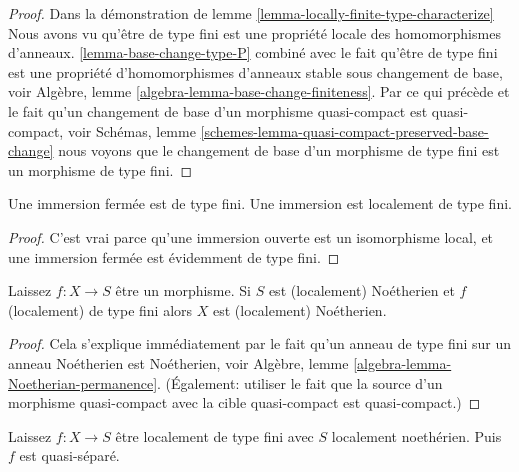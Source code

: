 \begin{proof}

Dans la démonstration de lemme \ref{lemma-locally-finite-type-characterize}
Nous avons vu qu'être de type fini est une propriété locale des homomorphismes d'anneaux. \ref{lemma-base-change-type-P} combiné avec le fait qu'être de type fini est une propriété d'homomorphismes d'anneaux stable sous changement de base, voir Algèbre, lemme \ref{algebra-lemma-base-change-finiteness}. Par ce qui précède et le fait qu'un changement de base d'un morphisme quasi-compact est quasi-compact, voir Schémas, lemme \ref{schemes-lemma-quasi-compact-preserved-base-change}
nous voyons que le changement de base d'un morphisme de type fini est un morphisme de type fini.

\end{proof}

\begin{lemma}

\label{lemma-immersion-locally-finite-type}
Une immersion fermée est de type fini. Une immersion est localement de type fini.
\end{lemma}

\begin{proof}

C'est vrai parce qu'une immersion ouverte est un isomorphisme local, et une immersion fermée est évidemment de type fini.

\end{proof}

\begin{lemma}

\label{lemma-finite-type-noetherian}
Laissez $f : X \to S$ être un morphisme. Si $S$ est (localement) Noétherien et $f$ (localement) de type fini alors $X$ est (localement) Noétherien.
\end{lemma}

\begin{proof}

Cela s'explique immédiatement par le fait qu'un anneau de type fini sur un anneau Noétherien est Noétherien, voir Algèbre, lemme \ref{algebra-lemma-Noetherian-permanence}. (Également: utiliser le fait que la source d'un morphisme quasi-compact avec la cible quasi-compact est quasi-compact.)

\end{proof}

\begin{lemma}

\label{lemma-finite-type-Noetherian-quasi-separated}
Laissez $f : X \to S$ être localement de type fini avec $S$ localement noethérien. Puis $f$ est quasi-séparé.
\end{lemma}


